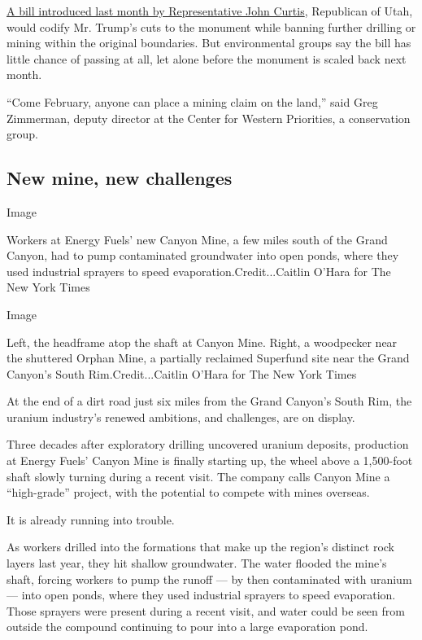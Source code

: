 \href{https://www.congress.gov/bill/115th-congress/house-bill/4532/text}{A
bill introduced last month by Representative John Curtis}, Republican of
Utah, would codify Mr. Trump's cuts to the monument while banning
further drilling or mining within the original boundaries. But
environmental groups say the bill has little chance of passing at all,
let alone before the monument is scaled back next month.

``Come February, anyone can place a mining claim on the land,'' said
Greg Zimmerman, deputy director at the Center for Western Priorities, a
conservation group.

\hypertarget{new-mine-new-challenges}{%
\subsection{New mine, new challenges}\label{new-mine-new-challenges}}

Image

Workers at Energy Fuels' new Canyon Mine, a few miles south of the Grand
Canyon, had to pump contaminated groundwater into open ponds, where they
used industrial sprayers to speed evaporation.Credit...Caitlin O'Hara
for The New York Times

Image

Left, the headframe atop the shaft at Canyon Mine. Right, a woodpecker
near the shuttered Orphan Mine, a partially reclaimed Superfund site
near the Grand Canyon's South Rim.Credit...Caitlin O'Hara for The New
York Times

At the end of a dirt road just six miles from the Grand Canyon's South
Rim, the uranium industry's renewed ambitions, and challenges, are on
display.

Three decades after exploratory drilling uncovered uranium deposits,
production at Energy Fuels' Canyon Mine is finally starting up, the
wheel above a 1,500-foot shaft slowly turning during a recent visit. The
company calls Canyon Mine a ``high-grade'' project, with the potential
to compete with mines overseas.

It is already running into trouble.

As workers drilled into the formations that make up the region's
distinct rock layers last year, they hit shallow groundwater. The water
flooded the mine's shaft, forcing workers to pump the runoff --- by then
contaminated with uranium --- into open ponds, where they used
industrial sprayers to speed evaporation. Those sprayers were present
during a recent visit, and water could be seen from outside the compound
continuing to pour into a large evaporation pond.

